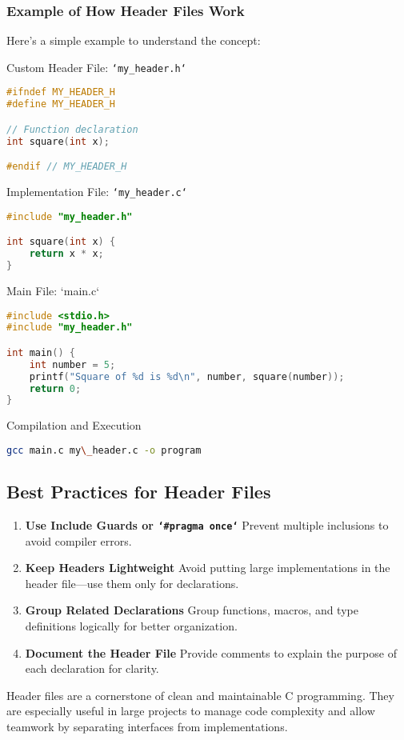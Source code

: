 \subsubsection{ Example of How Header Files Work}

Here’s a simple example to understand the concept:

 Custom Header File: \texttt{`my\_header.h`}

\begin{lstlisting}[caption=Example C++, label={lst:listing-cpp}, language=C++, style=myStyle]
#ifndef MY_HEADER_H
#define MY_HEADER_H

// Function declaration
int square(int x);

#endif // MY_HEADER_H
\end{lstlisting}


 Implementation File: \texttt{`my\_header.c`}

\begin{lstlisting}[caption=Example C++, label={lst:listing-cpp}, language=C++, style=myStyle]
	#include "my_header.h"

int square(int x) {
	return x * x;
}
\end{lstlisting}

 Main File: `main.c`
\begin{lstlisting}[caption=Example C++, label={lst:listing-cpp}, language=C++, style=myStyle]
#include <stdio.h>
#include "my_header.h"

int main() {
	int number = 5;
	printf("Square of %d is %d\n", number, square(number));
	return 0;
}
\end{lstlisting}

 Compilation and Execution
\begin{lstlisting}[caption=Bash, label={lst:listing-cpp}, language=bash, style=myStyle]
	gcc main.c my\_header.c -o program
\end{lstlisting}

\subsection{ Best Practices for Header Files}

\begin{enumerate}
	\item\textbf{Use Include Guards or \texttt{`\#pragma once`}} Prevent multiple inclusions to avoid compiler errors.
	\item\textbf{Keep Headers Lightweight} Avoid putting large implementations in the header file—use them only for declarations.
	\item\textbf{Group Related Declarations} Group functions, macros, and type definitions logically for better organization.
	\item\textbf{Document the Header File} Provide comments to explain the purpose of each declaration for clarity.
\end{enumerate}

Header files are a cornerstone of clean and maintainable C programming. They are especially useful in large projects to manage code complexity and allow teamwork by separating interfaces from implementations.